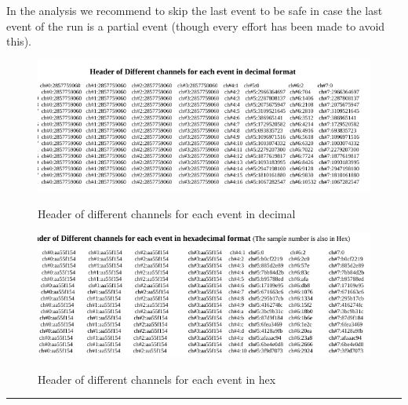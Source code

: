 \documentclass[12pt]{article}
\begin{document}
In the analysis we recommend to skip the last event to be safe in case the last event of the run is a partial event (though every effort has been made to avoid this).
     
\newpage     
\begin{figure}[htb]
\centering
\includegraphics[width=6in]{header1.png}\\
\caption{Header of different channels for each event in decimal}\label{f1}
\end{figure}

\begin{figure}[htb]
\centering
\includegraphics[width=6in]{header2.png}\\
\caption{Header of different channels for each event in hex}\label{f1}
\end{figure}

\noindent
{\color{red} \rule{\linewidth}{1mm} }
 
\newpage
\end{document}
